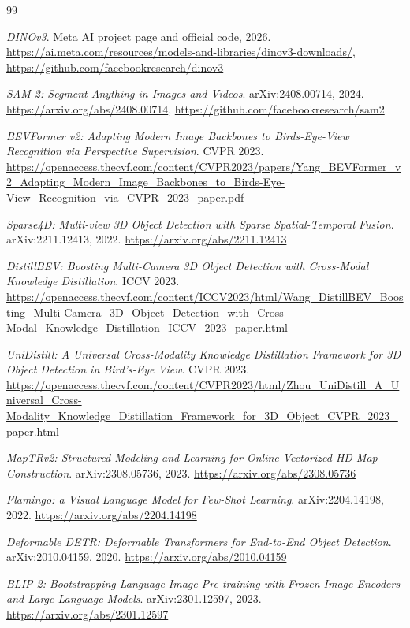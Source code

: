 \documentclass[11pt]{article}
\begin{document}
\begin{thebibliography}{99}

\emph{DINOv3}. Meta AI project page and official code, 2026.
\url{https://ai.meta.com/resources/models-and-libraries/dinov3-downloads/},
\url{https://github.com/facebookresearch/dinov3}

\emph{SAM 2: Segment Anything in Images and Videos}. arXiv:2408.00714, 2024.
\url{https://arxiv.org/abs/2408.00714},
\url{https://github.com/facebookresearch/sam2}

\emph{BEVFormer v2: Adapting Modern Image Backbones to Birds-Eye-View Recognition via Perspective
Supervision}. CVPR 2023.
\url{https://openaccess.thecvf.com/content/CVPR2023/papers/Yang_BEVFormer_v2_Adapting_Modern_Image_Backbones_to_Birds-Eye-View_Recognition_via_CVPR_2023_paper.pdf}

\emph{Sparse4D: Multi-view 3D Object Detection with Sparse Spatial-Temporal Fusion}. arXiv:2211.12413, 2022.
\url{https://arxiv.org/abs/2211.12413}

\emph{DistillBEV: Boosting Multi-Camera 3D Object Detection with Cross-Modal Knowledge Distillation}. ICCV 2023.
\url{https://openaccess.thecvf.com/content/ICCV2023/html/Wang_DistillBEV_Boosting_Multi-Camera_3D_Object_Detection_with_Cross-Modal_Knowledge_Distillation_ICCV_2023_paper.html}

\emph{UniDistill: A Universal Cross-Modality Knowledge Distillation Framework for 3D Object Detection in Bird's-Eye View}. CVPR 2023.
\url{https://openaccess.thecvf.com/content/CVPR2023/html/Zhou_UniDistill_A_Universal_Cross-Modality_Knowledge_Distillation_Framework_for_3D_Object_CVPR_2023_paper.html}

\emph{MapTRv2: Structured Modeling and Learning for Online Vectorized HD Map Construction}. arXiv:2308.05736, 2023.
\url{https://arxiv.org/abs/2308.05736}

\emph{Flamingo: a Visual Language Model for Few-Shot Learning}. arXiv:2204.14198, 2022.
\url{https://arxiv.org/abs/2204.14198}

\emph{Deformable DETR: Deformable Transformers for End-to-End Object Detection}. arXiv:2010.04159, 2020.
\url{https://arxiv.org/abs/2010.04159}

\emph{BLIP-2: Bootstrapping Language-Image Pre-training with Frozen Image Encoders and Large Language Models}. arXiv:2301.12597, 2023.
\url{https://arxiv.org/abs/2301.12597}


\end{thebibliography}
\end{document}
